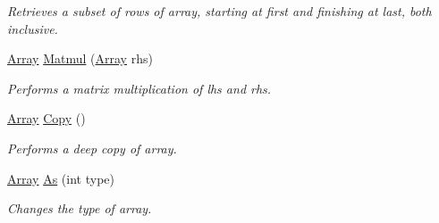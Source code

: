 \begin{DoxyCompactItemize}
\begin{DoxyCompactList}\small\item\em Retrieves a subset of rows of array, starting at first and finishing at last, both inclusive. \end{DoxyCompactList}\item 
\mbox{\hyperlink{classkhiva_1_1array_1_1_array}{Array}} \mbox{\hyperlink{classkhiva_1_1array_1_1_array_af2ca1ae045713c110a401ccb1938b8d0}{Matmul}} (\mbox{\hyperlink{classkhiva_1_1array_1_1_array}{Array}} rhs)
\begin{DoxyCompactList}\small\item\em Performs a matrix multiplication of lhs and rhs. \end{DoxyCompactList}\item 
\mbox{\hyperlink{classkhiva_1_1array_1_1_array}{Array}} \mbox{\hyperlink{classkhiva_1_1array_1_1_array_a2e7db9e6ce44e8e1f5e4a44552150847}{Copy}} ()
\begin{DoxyCompactList}\small\item\em Performs a deep copy of array. \end{DoxyCompactList}\item 
\mbox{\hyperlink{classkhiva_1_1array_1_1_array}{Array}} \mbox{\hyperlink{classkhiva_1_1array_1_1_array_a654cd4889c75244ff3048a3f53eb6980}{As}} (int type)
\begin{DoxyCompactList}\small\item\em Changes the type of array. \end{DoxyCompactList}\end{DoxyCompactItemize}
